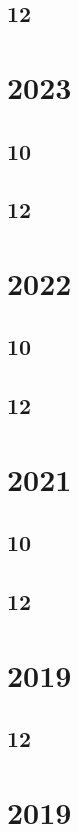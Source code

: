 \documentclass[11pt]{book}
\begin{document}
\subsection{12}

\section{2023}
\subsection{10}


\subsection{12}

\section{2022}
\subsection{10}

\subsection{12}

\section{2021}
\subsection{10}

\subsection{12}

\section{2019}
\subsection{12}





\section{2019}
\end{document}
